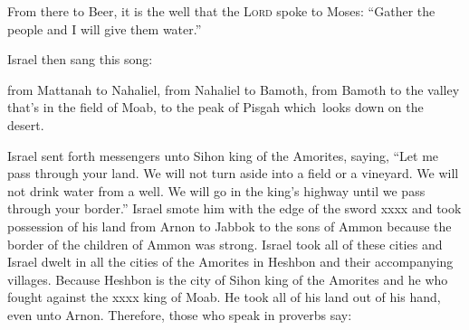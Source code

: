 \begin{inparaenum}
    
    
    \noindent{} From there to Beer, it is the well that the \textsc{Lord} spoke to Moses: ``Gather the people and I will give them water.''%
    
     Israel then sang this song:\smallskip%
    
    
    
    
    \noindent{} from Mattanah to Nahaliel, from Nahaliel to Bamoth,%
     from Bamoth to the valley that's in the field of Moab, to the peak of Pisgah which\understood\ looks down on the desert.%
    
     Israel sent forth messengers unto Sihon king of the Amorites, saying,%
     ``Let me pass through your land. We will not turn aside into a field or a vineyard. We will not drink water from a well. We will go in the king's highway until we pass through your border.''%
     Israel smote him with the edge of the sword xxxx and took possession of his land from Arnon to Jabbok to the sons of Ammon because the border of the children of Ammon was strong.%
     Israel took all of these cities and Israel dwelt in all the cities of the Amorites in Heshbon and their accompanying villages.%
     Because Heshbon is the city of Sihon king of the Amorites and he who fought against the xxxx king of Moab. He took all of his land out of his hand, even unto Arnon.%
     Therefore, those who speak in proverbs say:\smallskip%
    

\end{inparaenum}
